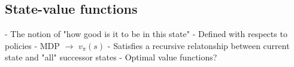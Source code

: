 \documentclass[11pt]{article}
\begin{document}
\maketitle

\subsection{State-value functions}

- The notion of "how good is it to be in this state"
- Defined with respects to policies
- MDP $\rightarrow$ $v_\pi(s)$
- Satisfies a recursive relatonship between current state and "all" successor states
- Optimal value functions?


%
%
\end{document}
